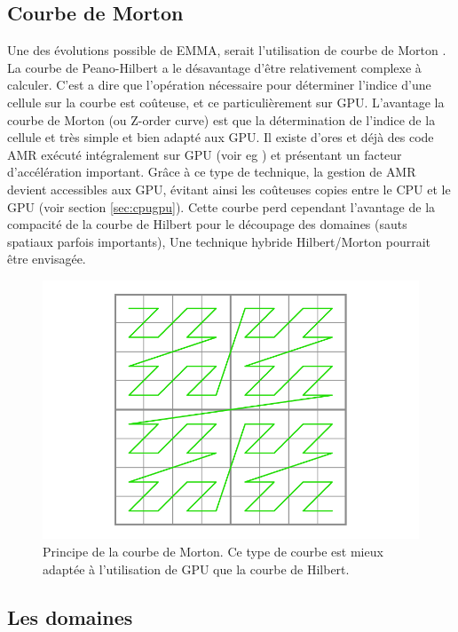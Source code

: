 \subsection{Courbe de Morton}

Une des évolutions possible de EMMA, serait l'utilisation de courbe de Morton \citep{morton1966computer}.
La courbe de Peano-Hilbert a le désavantage d'être relativement complexe à calculer.
C'est a dire que l'opération nécessaire pour déterminer l'indice d'une cellule sur la courbe est coûteuse, et ce particulièrement sur \ac{GPU}.
L'avantage la courbe de Morton (ou Z-order curve) est que la détermination de l'indice de la cellule et très simple et bien adapté aux \ac{GPU}.
Il existe d'ores et déjà des code \ac{AMR} exécuté intégralement sur \ac{GPU} (voir eg \cite{2012ASPC..453..325B}) et présentant un facteur d'accélération important.
Grâce à ce type de technique, la gestion de \ac{AMR} devient accessibles aux \ac{GPU}, évitant ainsi les coûteuses copies entre le \ac{CPU} et le \ac{GPU} (voir section \ref{sec:cpugpu}).
Cette courbe perd cependant l'avantage de la compacité de la courbe de Hilbert pour le découpage des domaines (sauts spatiaux parfois importants),
Une technique hybride Hilbert/Morton pourrait être envisagée.

\begin{figure}
        \includegraphics[width=.95\linewidth]{img/02/ZCurve.png} 
        \caption[Courbe de Morton]{Principe de la courbe de Morton.
        Ce type de courbe est mieux adaptée à l'utilisation de \ac{GPU} que la courbe de Hilbert.
 		\label{fig:hilbert}}
\end{figure}


\subsection{Les domaines}

